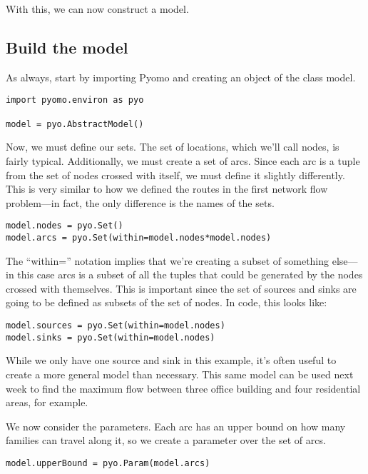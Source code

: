 \documentclass{article}
\begin{document}
With this, we can now construct a model.

\subsection*{Build the model}

As always, start by importing Pyomo and creating an object of the class model.

\begin{verbatim}
import pyomo.environ as pyo

model = pyo.AbstractModel()
\end{verbatim}

Now, we must define our sets.  The set of locations, which we'll call nodes, is fairly typical.  Additionally, we must create a set of arcs.  Since each arc is a tuple from the set of nodes crossed with itself, we must define it slightly differently.  This is very similar to how we defined the routes in the first network flow problem---in fact, the only difference is the names of the sets.

\begin{verbatim}
model.nodes = pyo.Set()
model.arcs = pyo.Set(within=model.nodes*model.nodes)
\end{verbatim}

The ``within='' notation implies that we're creating a subset of something else---in this case arcs is a subset of all the tuples that could be generated by the nodes crossed with themselves.  This is important since the set of sources and sinks are going to be defined as subsets of the set of nodes.  In code, this looks like:

\begin{verbatim}
model.sources = pyo.Set(within=model.nodes)
model.sinks = pyo.Set(within=model.nodes)
\end{verbatim}

\noindent
While we only have one source and sink in this example, it's often useful to create a more general model than necessary.  This same model can be used next week to find the maximum flow between three office building and four residential areas, for example.

We now consider the parameters.  Each arc has an upper bound on how many families can travel along it, so we create a parameter over the set of arcs.

\begin{verbatim}
model.upperBound = pyo.Param(model.arcs)
\end{verbatim}
\end{document}
